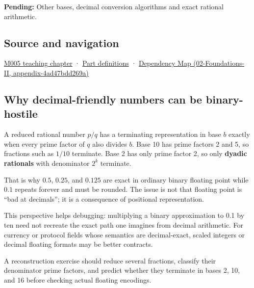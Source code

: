 \textbf{Pending:} Other bases, decimal conversion algorithms and exact rational arithmetic.

\subsection{Source and navigation}\label{source-and-navigation}

\href{Continuous\%20Notes/Computing\%20Foundations\%20-\%20From\%20Bits\%20to\%20C++\%20and\%20Systems\%20APIs\#When\%20arithmetic\%20meets\%20uncertainty}{M005 teaching chapter} · \hyperref[appendix-fd090d982a15]{Part definitions} · \href{}{Dependency Map (02-Foundations-II, appendix-4ad47bdd269a)}

\subsection{Why decimal-friendly numbers can be binary-hostile}\label{why-decimal-friendly-numbers-can-be-binary-hostile}

A reduced rational number \(p/q\) has a terminating representation in base \(b\) exactly when every prime factor of \(q\) also divides \(b\). Base 10 has prime factors 2 and 5, so fractions such as \(1/10\) terminate. Base 2 has only prime factor 2, so only \textbf{dyadic rationals} with denominator \(2^k\) terminate.

That is why \(0.5\), \(0.25\), and \(0.125\) are exact in ordinary binary floating point while \(0.1\) repeats forever and must be rounded. The issue is not that floating point is ``bad at decimals''; it is a consequence of positional representation.

This perspective helps debugging: multiplying a binary approximation to 0.1 by ten need not recreate the exact path one imagines from decimal arithmetic. For currency or protocol fields whose semantics are decimal-exact, scaled integers or decimal floating formats may be better contracts.

A reconstruction exercise should reduce several fractions, classify their denominator prime factors, and predict whether they terminate in bases 2, 10, and 16 before checking actual floating encodings.
